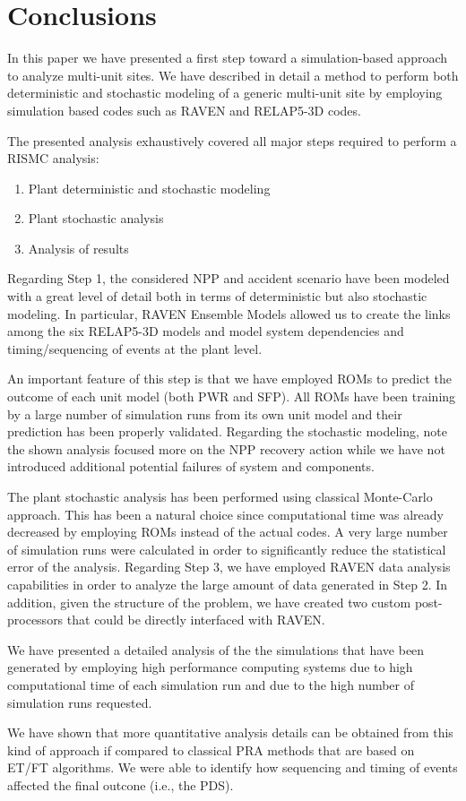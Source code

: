 \section{Conclusions}
\label{sec:conclusions}

In this paper we have presented a first step toward a simulation-based approach to analyze 
multi-unit sites. We have described in detail a method to perform both deterministic and 
stochastic modeling of a generic multi-unit site by employing simulation based codes such
as RAVEN and RELAP5-3D codes. 

The presented analysis exhaustively covered all major steps required to perform a RISMC 
analysis:
\begin{enumerate}
  \item Plant deterministic and stochastic modeling
  \item Plant stochastic analysis
  \item Analysis of results
\end{enumerate}

Regarding Step 1, the considered NPP and accident scenario have been modeled with a great level 
of detail both in terms of deterministic but also stochastic modeling. In particular, 
RAVEN Ensemble Models allowed us to create the links among the six RELAP5-3D models and 
model system dependencies and timing/sequencing of events at the plant level. 

An important feature of this step is that we have employed ROMs to predict the outcome of 
each unit model (both PWR and SFP). All ROMs have been training by a large number of simulation 
runs from its own unit model and their prediction has been properly validated. Regarding the 
stochastic modeling, note the shown analysis focused more on the NPP recovery action while we 
have not introduced additional potential failures of system and components.
    
The plant stochastic analysis has been performed using classical Monte-Carlo approach. 
This has been a natural choice since computational time was already decreased by employing 
ROMs instead of the actual codes. A very large number of simulation runs were calculated in 
order to significantly reduce the statistical error of the analysis.
Regarding Step 3, we have employed RAVEN data analysis capabilities in order to analyze the 
large amount of data generated in Step 2. In addition, given the structure of the problem, 
we have created two custom post-processors that could be directly interfaced with RAVEN.

We have presented a detailed analysis of the the simulations that have been generated by employing high 
performance computing systems due to high computational time of each simulation run and due 
to the high number of simulation runs requested. 

We have shown that more quantitative analysis details can be obtained from this kind of 
approach if compared to classical PRA methods that are based on ET/FT algorithms. We were able
to identify how sequencing and timing of events affected the final outcone (i.e., the PDS).
